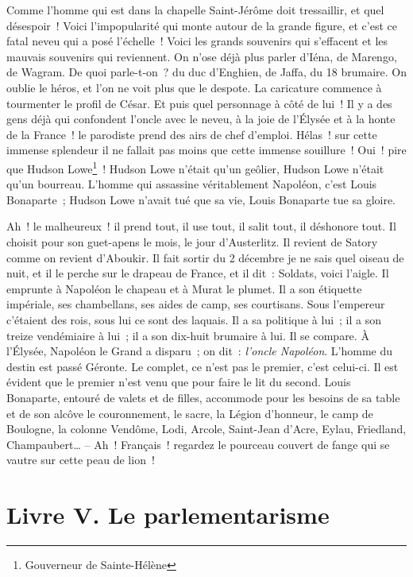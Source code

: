 \documentclass[french,twoside]{book} %
\begin{document}
Comme l’homme qui est dans la chapelle Saint-Jérôme doit tressaillir, et quel désespoir ! Voici l’impopularité qui monte autour de la grande figure, et c’est ce fatal neveu qui a posé l’échelle ! Voici les grands souvenirs qui s’effacent et les mauvais souvenirs qui reviennent. On n’ose déjà plus parler d’Iéna, de Marengo, de Wagram. De quoi parle-t-on ? du duc d’Enghien, de Jaffa, du 18 brumaire. On oublie le héros, et l’on ne voit plus que le despote. La caricature commence à tourmenter le profil de César. Et puis quel personnage à côté de lui ! Il y a des gens déjà qui confondent l’oncle avec le neveu, à la joie de l’Élysée et à la honte de la France ! le parodiste prend des airs de chef d’emploi. Hélas ! sur cette immense splendeur il ne fallait pas moins que cette immense souillure ! Oui ! pire que Hudson Lowe\footnote{Gouverneur de Sainte-Hélène} ! Hudson Lowe n’était qu’un geôlier, Hudson Lowe n’était qu’un bourreau. L’homme qui assassine véritablement Napoléon, c’est Louis Bonaparte ; Hudson Lowe n’avait tué que sa vie, Louis Bonaparte tue sa gloire.\par
Ah ! le malheureux ! il prend tout, il use tout, il salit tout, il déshonore tout. Il choisit pour son guet-apens le mois, le jour d’Austerlitz. Il revient de Satory comme on revient d’Aboukir. Il fait sortir du 2 décembre je ne sais quel oiseau de nuit, et il le perche sur le drapeau de France, et il dit : Soldats, voici l’aigle. Il emprunte à Napoléon le chapeau et à Murat le plumet. Il a son étiquette impériale, ses chambellans, ses aides de camp, ses courtisans. Sous l’empereur c’étaient des rois, sous lui ce sont des laquais. Il a sa politique à lui ; il a son treize vendémiaire à lui ; il a son dix-huit brumaire à lui. Il se compare. À l’Élysée, Napoléon le Grand a disparu ; on dit : \emph{l’oncle Napoléon}. L’homme du destin est passé Géronte. Le complet, ce n’est pas le premier, c’est celui-ci. Il est évident que le premier n’est venu que pour faire le lit du second. Louis Bonaparte, entouré de valets et de filles, accommode pour les besoins de sa table et de son alcôve le couronnement, le sacre, la Légion d’honneur, le camp de Boulogne, la colonne Vendôme, Lodi, Arcole, Saint-Jean d’Acre, Eylau, Friedland, Champaubert… – Ah ! Français ! regardez le pourceau couvert de fange qui se vautre sur cette peau de lion !
\section[{Livre V. Le parlementarisme}]{Livre V. Le parlementarisme}\renewcommand{\leftmark}{Livre V. Le parlementarisme}
\end{document}
